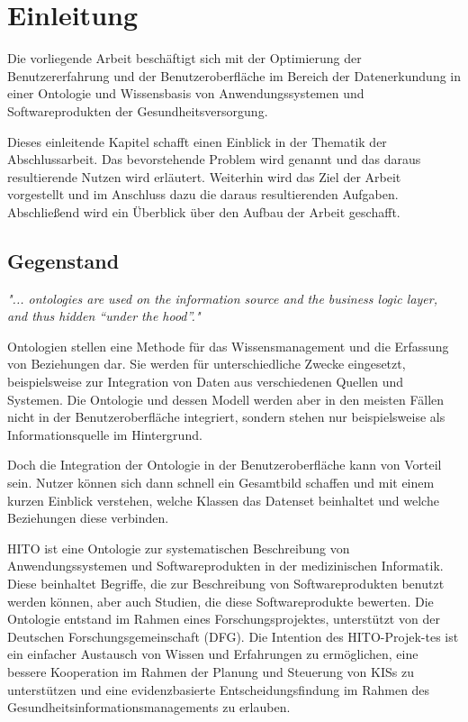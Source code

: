 \chapter{Einleitung}\label{ch:introduction}

Die vorliegende Arbeit beschäftigt sich mit der Optimierung der Benutzererfahrung und der Benutzeroberfläche im Bereich der Datenerkundung in einer Ontologie und Wissensbasis von Anwendungssystemen und Softwareprodukten der Gesundheitsversorgung.

Dieses einleitende Kapitel schafft einen Einblick in der Thematik der Abschlussarbeit. 
Das bevorstehende Problem wird genannt und das daraus resultierende Nutzen wird erläutert. 
Weiterhin wird das Ziel der Arbeit vorgestellt und im Anschluss dazu die daraus resultierenden Aufgaben. 
Abschließend wird ein Überblick über den Aufbau der Arbeit geschafft.

\section{Gegenstand}\label{sec:gegenstand}

\begin{center}
\textit{"... ontologies are used on the information source and the business logic layer, and thus hidden “under the hood”."}
\end{center}

\begin{flushright}
\textit{ \textendash{} \citep{paulheim2010ontology}} \newline
\end{flushright}

Ontologien stellen eine Methode für das Wissensmanagement und die Erfassung von Beziehungen dar.
Sie werden für unterschiedliche Zwecke eingesetzt, beispielsweise zur Integration von Daten aus verschiedenen Quellen und Systemen.
Die Ontologie und dessen Modell werden aber in den meisten Fällen nicht in der Benutzeroberfläche integriert, sondern stehen nur beispielsweise als Informationsquelle im Hintergrund. \citep[vgl.]{paulheim2010ontology}

Doch die Integration der Ontologie in der Benutzeroberfläche kann von Vorteil sein. 
Nutzer können sich dann schnell ein Gesamtbild schaffen und mit einem kurzen Einblick verstehen, welche Klassen das Datenset beinhaltet und welche Beziehungen diese verbinden. \citep[vgl.]{linkeddatavisualization}

\ac{HITO} ist eine Ontologie zur systematischen Beschreibung von Anwendungssystemen und Softwareprodukten in der medizinischen Informatik.
Diese beinhaltet Begriffe, die zur Beschreibung von Softwareprodukten benutzt werden können, aber auch Studien, die diese Softwareprodukte bewerten.
Die Ontologie entstand im Rahmen eines Forschungsprojektes, unterstützt von der Deutschen Forschungsgemeinschaft (\acs{DFG}).
Die Intention des HITO-Projek-tes ist ein einfacher Austausch von Wissen und Erfahrungen zu ermöglichen, eine bessere Kooperation im Rahmen der Planung und Steuerung von \acp{KIS} zu unterstützen und eine evidenzbasierte Entscheidungsfindung im Rahmen des Gesundheitsinformationsmanagements zu erlauben.

